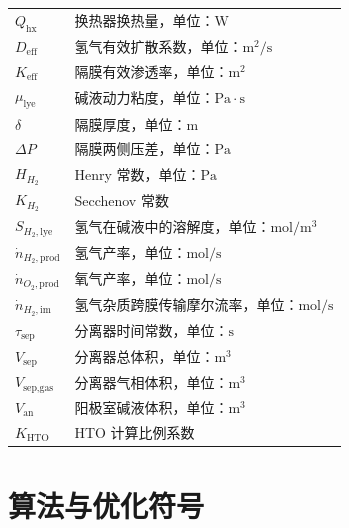 \begin{longtable}{@{}l p{10cm}@{}}
$Q_{\text{hx}}$ & 换热器换热量，单位：$\mathrm{W}$ \\
\addlinespace
$D_{\text{eff}}$ & 氢气有效扩散系数，单位：$\mathrm{m}^2/\mathrm{s}$ \\
$K_{\text{eff}}$ & 隔膜有效渗透率，单位：$\mathrm{m}^2$ \\
$\mu_{\text{lye}}$ & 碱液动力粘度，单位：$\mathrm{Pa}\cdot\mathrm{s}$ \\
$\delta$ & 隔膜厚度，单位：$\mathrm{m}$ \\
$\Delta P$ & 隔膜两侧压差，单位：$\mathrm{Pa}$ \\
$H_{H_2}$ & Henry 常数，单位：$\mathrm{Pa}$ \\
$K_{H_2}$ & Secchenov 常数 \\
$S_{H_2,\text{lye}}$ & 氢气在碱液中的溶解度，单位：$\mathrm{mol}/\mathrm{m}^3$ \\
$\dot{n}_{H_2,\text{prod}}$ & 氢气产率，单位：$\mathrm{mol}/\mathrm{s}$ \\
$\dot{n}_{O_2,\text{prod}}$ & 氧气产率，单位：$\mathrm{mol}/\mathrm{s}$ \\
$\dot{n}_{H_2,\text{im}}$ & 氢气杂质跨膜传输摩尔流率，单位：$\mathrm{mol}/\mathrm{s}$ \\
$\tau_{\text{sep}}$ & 分离器时间常数，单位：$\mathrm{s}$ \\
$V_{\text{sep}}$ & 分离器总体积，单位：$\mathrm{m}^3$ \\
$V_{\text{sep,gas}}$ & 分离器气相体积，单位：$\mathrm{m}^3$ \\
$V_{\text{an}}$ & 阳极室碱液体积，单位：$\mathrm{m}^3$ \\
$K_{\text{HTO}}$ & HTO 计算比例系数 \\
\end{longtable}

\section{算法与优化符号}

